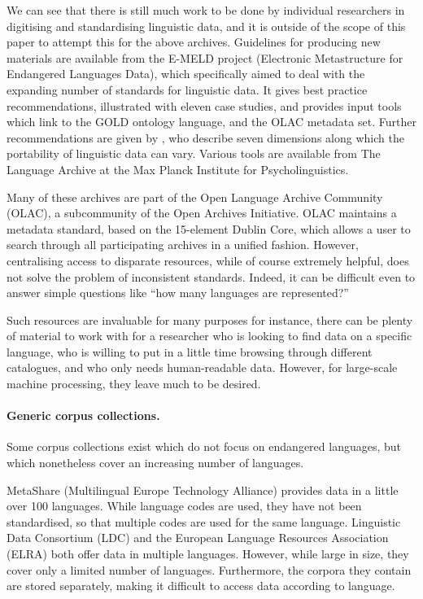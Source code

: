 We can see that there is still much work to be done by individual researchers in digitising and standardising linguistic data, and it is outside of the scope of this paper to attempt this for the above archives.  Guidelines for producing new materials are available from the E-MELD project (Electronic Metastructure for Endangered Languages Data), which specifically aimed to deal with the expanding number of standards for linguistic data.  It gives best practice recommendations, illustrated with eleven case studies, and provides input tools which link to the GOLD ontology language, and the OLAC metadata set.  Further recommendations are given by , who describe seven dimensions along which the portability of linguistic data can vary. Various tools are available from The Language Archive at the Max Planck Institute for Psycholinguistics.

Many of these archives are part of the Open Language Archive Community (OLAC), a subcommunity of the Open Archives Initiative.  OLAC maintains a metadata standard, based on the 15-element Dublin Core, which allows a user to search through all participating archives in a unified fashion.  However, centralising access to disparate resources, while of course extremely helpful, does not solve the problem of inconsistent standards.  Indeed, it can be difficult even to answer simple questions like ``how many languages are represented?''

Such resources are invaluable for many purposes
for instance, there can be plenty of material to work with for a
researcher who is looking to find data on a specific language, who is
willing to put in a little time browsing through different catalogues,
and who only needs human-readable data.  However, for large-scale
machine processing, they leave much to be desired.


\paragraph{Generic corpus collections.}
Some corpus collections exist which do not focus on endangered languages, but which nonetheless cover an increasing number of languages.

MetaShare (Multilingual Europe Technology Alliance) provides data in a little over 100 languages. 
While language codes are used, they have not been standardised, so that multiple codes are used for the same language.  Linguistic Data Consortium (LDC) and the European Language Resources Association (ELRA) both offer data in multiple languages.  However, while large in size, they cover only a limited number of languages.  Furthermore, the corpora they contain are stored separately, making it difficult to access data according to language.

